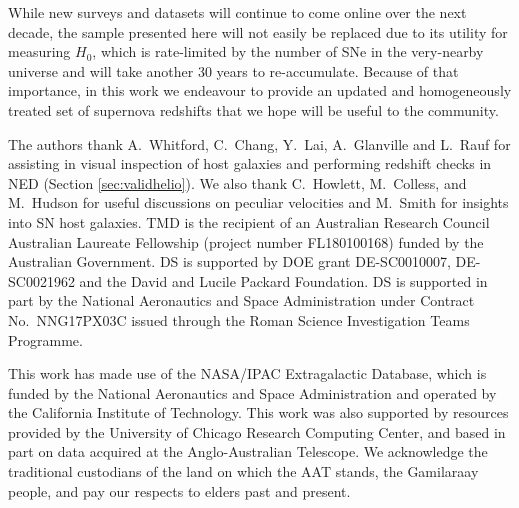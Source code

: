 \documentclass[
  journal=pasa,
  manuscript=research-paper,
  year=2022,
]{cup-journal}
\begin{document}
While new surveys and datasets will continue to come online over the next decade, the sample presented here will not easily be replaced due to its utility for measuring $H_0$, which is rate-limited by the number of SNe in the very-nearby universe and will take another 30 years to re-accumulate. 
Because of that importance, in this work we endeavour to provide an updated and homogeneously treated set of supernova redshifts that we hope will be useful to the community. 

\begin{acknowledgement}
The authors thank A.~Whitford, C.~Chang, Y.~Lai, A.~Glanville and L.~Rauf for assisting in visual inspection of host galaxies and performing redshift checks in NED (Section \ref{sec:validhelio}).  We also thank C.~Howlett, M.~Colless, and M.~Hudson for useful discussions on peculiar velocities and M.~Smith for insights into SN host galaxies.
TMD is the recipient of an Australian Research Council Australian Laureate Fellowship (project number FL180100168) funded by the Australian Government. DS is supported by DOE grant DE-SC0010007, DE-SC0021962 and the David and Lucile Packard Foundation. DS is supported in part by the National Aeronautics and Space Administration under Contract No.~NNG17PX03C issued through the Roman Science Investigation Teams Programme.

This work has made use of the NASA/IPAC Extragalactic Database, which is funded by the National Aeronautics and Space Administration and operated by the California Institute of Technology.
This work was also supported by resources provided by the University of Chicago Research Computing Center, and based in part on data acquired at the Anglo-Australian Telescope. We acknowledge the traditional custodians of the land on which the AAT stands, the Gamilaraay people, and pay our respects to elders past and present. 
\end{acknowledgement}



\clearpage
\onecolumn

\appendix
\renewcommand{\thetable}{A\arabic{table}}
\renewcommand{\theHtable}{A\arabic{table}} %
\setcounter{table}{0}
\end{document}
